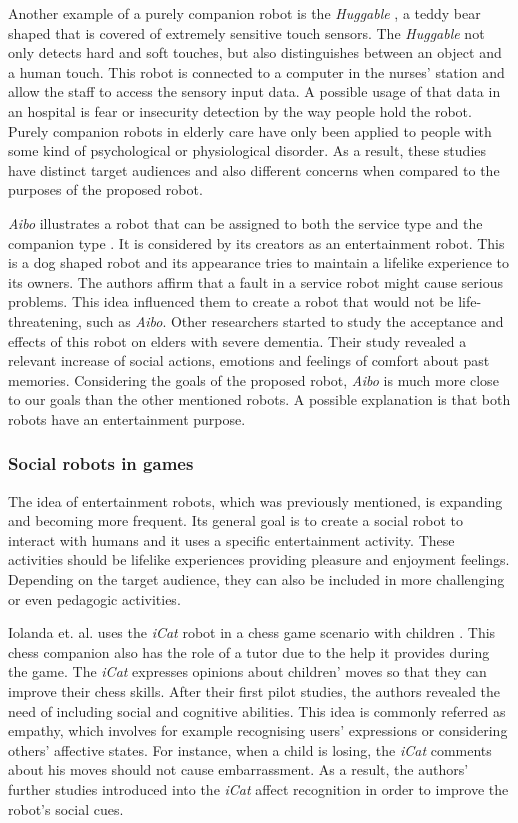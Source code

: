 Another example of a purely companion robot is the \emph{Huggable} \cite{Stiehl2005}, a teddy bear shaped that is covered of extremely sensitive touch sensors.
The \emph{Huggable} not only detects hard and soft touches, but also distinguishes between an object and a human touch.
This robot is connected to a computer in the nurses' station and allow the staff to access the sensory input data.
A possible usage of that data in an hospital is fear or insecurity detection  by the way people hold the robot.
Purely companion robots in elderly care have only been applied to people with some kind of psychological or physiological disorder.
As a result, these studies have distinct target audiences and also different concerns when compared to the purposes of the proposed robot.


\emph{Aibo} illustrates a robot that can be assigned to both the service type and the companion type \cite{Fujita1983}.
It is considered by its creators as an entertainment robot.
This is a dog shaped robot and its appearance tries to maintain a lifelike experience to its owners.
The authors affirm that a fault in a service robot might cause serious problems.
This idea influenced them to create a robot that would not be life-threatening, such as \emph{Aibo}.
Other researchers started to study the acceptance and effects of this robot on elders with severe dementia.
Their study revealed a relevant increase of social actions, emotions and feelings of comfort about past memories.
Considering the goals of the proposed robot, \emph{Aibo} is much more close to our goals than the other mentioned robots.
A possible explanation is that both robots have an entertainment purpose.



\subsubsection{Social robots in games}

The idea of entertainment robots, which was previously mentioned, is expanding and becoming more frequent.
Its general goal is to create a social robot to interact with humans and it uses a specific entertainment activity.
These activities should be lifelike experiences providing pleasure and enjoyment feelings.
Depending on the target audience, they can also be included in more challenging or even pedagogic activities.

Iolanda et. al. uses the \emph{iCat} robot in a chess game scenario with children \cite{Leitea,Castellano2010,Leite}.
This chess companion also has the role of a tutor due to the help it provides during the game.
The \emph{iCat} expresses opinions about children' moves so that they can improve their chess skills.
After their first pilot studies, the authors revealed the need of including social and cognitive abilities.
This idea is commonly referred as empathy, which involves for example recognising users' expressions or considering others' affective states.
For instance, when a child is losing, the \emph{iCat} comments about his moves should not cause embarrassment.
As a result, the authors' further studies introduced into the \emph{iCat} affect recognition in order to improve the robot's social cues.

